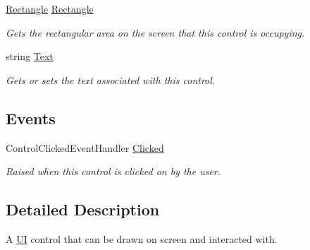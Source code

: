 \begin{DoxyCompactItemize}
\hyperlink{struct_tri_devs_1_1_tri_engine2_d_1_1_rectangle}{Rectangle} \hyperlink{interface_tri_devs_1_1_tri_engine2_d_1_1_u_i_1_1_i_control_ab75652686e2cf736e50995aef3dd8183}{Rectangle}
\begin{DoxyCompactList}\small\item\em Gets the rectangular area on the screen that this control is occupying. \end{DoxyCompactList}\item 
string \hyperlink{interface_tri_devs_1_1_tri_engine2_d_1_1_u_i_1_1_i_control_a4d46268068ed2824a1ad78be6b3a9ebb}{Text}
\begin{DoxyCompactList}\small\item\em Gets or sets the text associated with this control. \end{DoxyCompactList}\end{DoxyCompactItemize}
\subsection*{Events}
\begin{DoxyCompactItemize}
\item 
Control\-Clicked\-Event\-Handler \hyperlink{interface_tri_devs_1_1_tri_engine2_d_1_1_u_i_1_1_i_control_a769d812172bdfb85b0d605b843be9593}{Clicked}
\begin{DoxyCompactList}\small\item\em Raised when this control is clicked on by the user. \end{DoxyCompactList}\end{DoxyCompactItemize}


\subsection{Detailed Description}
A \hyperlink{namespace_tri_devs_1_1_tri_engine2_d_1_1_u_i}{U\-I} control that can be drawn on screen and interacted with. 



